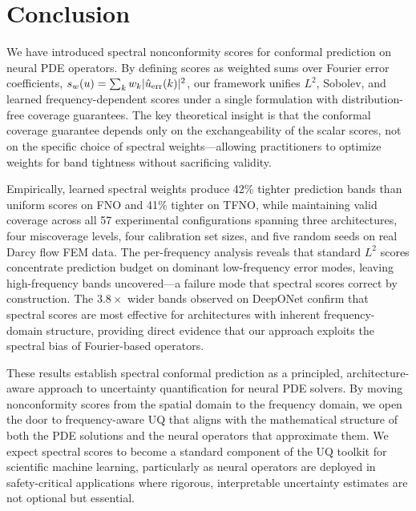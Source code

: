 
\section{Conclusion}
\label{sec:conclusion}

We have introduced spectral nonconformity scores for conformal prediction on neural PDE operators. By defining scores as weighted sums over Fourier error coefficients, $s_w(u) = \sum_k w_k |\hat{u}_{\mathrm{err}}(k)|^2$, our framework unifies $L^2$, Sobolev, and learned frequency-dependent scores under a single formulation with distribution-free coverage guarantees. The key theoretical insight is that the conformal coverage guarantee depends only on the exchangeability of the scalar scores, not on the specific choice of spectral weights---allowing practitioners to optimize weights for band tightness without sacrificing validity.

Empirically, learned spectral weights produce 42\% tighter prediction bands than uniform scores on FNO and 41\% tighter on TFNO, while maintaining valid coverage across all 57 experimental configurations spanning three architectures, four miscoverage levels, four calibration set sizes, and five random seeds on real Darcy flow FEM data. The per-frequency analysis reveals that standard $L^2$ scores concentrate prediction budget on dominant low-frequency error modes, leaving high-frequency bands uncovered---a failure mode that spectral scores correct by construction. The $3.8\times$ wider bands observed on DeepONet confirm that spectral scores are most effective for architectures with inherent frequency-domain structure, providing direct evidence that our approach exploits the spectral bias of Fourier-based operators.

These results establish spectral conformal prediction as a principled, architecture-aware approach to uncertainty quantification for neural PDE solvers. By moving nonconformity scores from the spatial domain to the frequency domain, we open the door to frequency-aware UQ that aligns with the mathematical structure of both the PDE solutions and the neural operators that approximate them. We expect spectral scores to become a standard component of the UQ toolkit for scientific machine learning, particularly as neural operators are deployed in safety-critical applications where rigorous, interpretable uncertainty estimates are not optional but essential.

